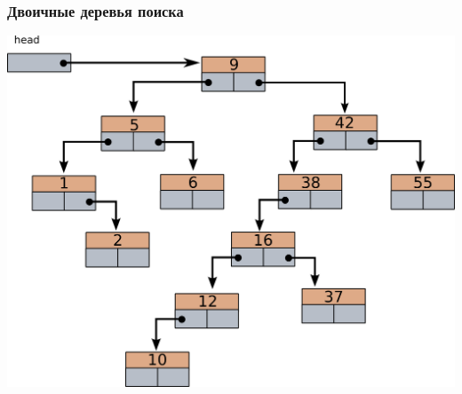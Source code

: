 \documentclass[10pt]{beamer}
\begin{document}
\begin{frame}[fragile]
\frametitle{Двоичные деревья поиска}  
\begin{center}
\includegraphics[width=0.75\linewidth]{images/bintree_search_1.png}
\end{center}
\end{frame}
\end{document}
